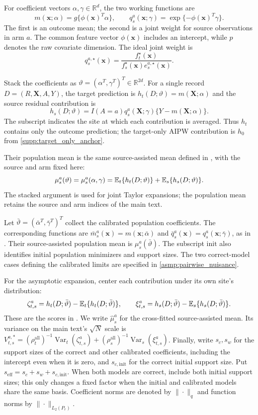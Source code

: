 \documentclass[12pt]{article}
\begin{document}
For coefficient vectors $\alpha,\gamma\in\mathbb R^d$, the two working functions are
\[
m(\boldsymbol x;\alpha)=g\{\phi(\boldsymbol x)^T\alpha\},
\qquad q_{s}^a(\boldsymbol x;\gamma)=\exp\{-\phi(\boldsymbol x)^T\gamma\}.
\]
The first is an outcome mean; the second is a joint weight for source observations in arm $a$. The common feature vector $\phi(\boldsymbol x)$ includes an intercept, while $p$ denotes the raw covariate dimension. The ideal joint weight is
\[
q_s^{a,\star}(\boldsymbol x)
=\frac{f_t^\star(\boldsymbol x)}{f_s^\star(\boldsymbol x)e_s^{a,\star}(\boldsymbol x)}.
\]

Stack the coefficients as $\vartheta=(\alpha^T,\gamma^T)^T\in\mathbb R^{2d}$. For a single record $D=(R,\boldsymbol X,A,Y)$, the target prediction is $h_t(D;\vartheta)=m(\boldsymbol X;\alpha)$ and the source residual contribution is
\[
h_s(D;\vartheta)=I(A=a)q_{s}^a(\boldsymbol X;\gamma)
\{Y-m(\boldsymbol X;\alpha)\}.
\]
The subscript indicates the site at which each contribution is averaged. Thus $h_t$ contains only the outcome prediction; the target-only AIPW contribution is $h_0$ from \cref{supp:target_only_anchor}.

Their population mean is the same source-assisted mean defined in , with the source and arm fixed here:
\[
\mu_s^a(\vartheta)=\mu_s^a(\alpha,\gamma)
=\mathbb{E}_t\{h_t(D;\vartheta)\}+\mathbb{E}_s\{h_s(D;\vartheta)\}.
\]
The stacked argument is used for joint Taylor expansions; the population mean retains the source and arm indices of the main text.

Let $\bar\vartheta=(\bar\alpha^T,\bar\gamma^T)^T$ collect the calibrated population coefficients. The corresponding functions are $\bar m_s^a(\boldsymbol x)=m(\boldsymbol x;\bar\alpha)$ and $\bar q_s^a(\boldsymbol x)=q_s^a(\boldsymbol x;\bar\gamma)$, as in . Their source-assisted population mean is $\mu_s^a(\bar\vartheta)$. The subscript $\mathrm{init}$ also identifies initial population minimizers and support sizes. The two correct-model cases defining the calibrated limits are specified in \cref{asmp:pairwise_nuisance}.

For the asymptotic expansion, center each contribution under its own site's distribution:
\[
\zeta_{t,s}^a=h_t(D;\bar\vartheta)-\mathbb{E}_t\{h_t(D;\bar\vartheta)\},
\qquad \xi_{t,s}^a=h_s(D;\bar\vartheta)-\mathbb{E}_s\{h_s(D;\bar\vartheta)\}.
\]
These are the scores in . We write $\widehat\mu_s^a$ for the cross-fitted source-assisted mean. Its variance on the main text's $\sqrt N$ scale is $V_{t,s}^{a,*}=(\rho_t^{\mathrm{all}})^{-1}\operatorname{Var}_t(\zeta_{t,s}^a)+(\rho_s^{\mathrm{all}})^{-1}\operatorname{Var}_s(\xi_{t,s}^a)$.
Finally, write $s_c,s_w$ for the support sizes of the correct and other calibrated coefficients, including the intercept even when it is zero, and $s_{c,\mathrm{init}}$ for the correct initial support size. Put $s_{\mathrm{eff}}=s_c+s_w+s_{c,\mathrm{init}}$. When both models are correct, include both initial support sizes; this only changes a fixed factor when the initial and calibrated models share the same basis. Coefficient norms are denoted by $\|\cdot\|_q$ and function norms by $\|\cdot\|_{L_2(P_r)}$.
\end{document}
